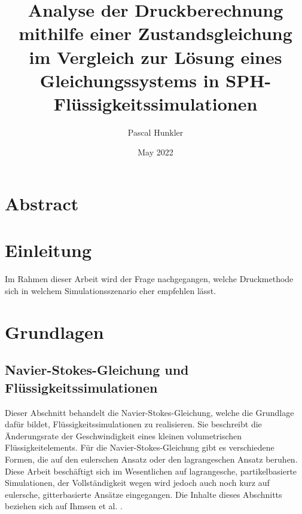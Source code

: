 \documentclass{scrreprt}
\title{Analyse der Druckberechnung mithilfe einer Zustandsgleichung im Vergleich zur Lösung eines Gleichungssystems in SPH- Flüssigkeitssimulationen}
\author{Pascal Hunkler}
\date{May 2022}
\begin{document}
\maketitle

\setlength{\parindent}{0pt}
\setlength{\parskip}{1em}

\tableofcontents

\chapter{Abstract}
\chapter{Einleitung}
Im Rahmen dieser Arbeit wird der Frage nachgegangen, welche Druckmethode sich in welchem Simulationsszenario eher empfehlen lässt.

\chapter{Grundlagen}
\section{Navier-Stokes-Gleichung und Flüssigkeitssimulationen}
Dieser Abschnitt behandelt die Navier-Stokes-Gleichung, welche die Grundlage dafür bildet, Flüssigkeitssimulationen zu realisieren.
Sie beschreibt die Änderungsrate der Geschwindigkeit eines kleinen volumetrischen Flüssigkeitelements.
Für die Navier-Stokes-Gleichung gibt es verschiedene Formen, die auf den eulerschen Ansatz oder den lagrangeschen Ansatz beruhen.
Diese Arbeit beschäftigt sich im Wesentlichen auf lagrangesche, partikelbasierte Simulationen,
der Vollständigkeit wegen wird jedoch auch noch kurz auf eulersche, gitterbasierte Ansätze eingegangen.
Die Inhalte dieses Abschnitts beziehen sich auf Ihmsen et al. \cite{ihmsen_sph_2014}.
\end{document}
